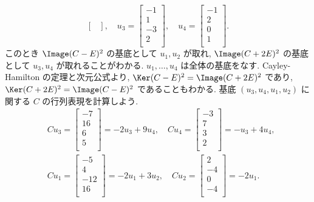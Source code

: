 \documentclass[12pt,twoside]{jarticle}
\begin{document}
\begin{example}
\begin{equation*}
\begin{bmatrix}
    \end{bmatrix},
    \quad
    u_3 =
    \begin{bmatrix}
      -1 \\ 1 \\ -3 \\ 2 \\
    \end{bmatrix},
    \quad
    u_4 =
    \begin{bmatrix}
      -1 \\ 2 \\ 0 \\ 1 \\
    \end{bmatrix}.
  \end{equation*}
  このとき $\Image(C-E)^2$ の基底として $u_1,u_2$ が取れ,
  $\Image(C+2E)^2$ の基底として $u_3,u_4$ が取れることがわかる.
  $u_1,\ldots,u_4$ は全体の基底をなす.
  Cayley-Hamilton の定理と次元公式より, 
  $\Ker(C-E)^2=\Image(C+2E)^2$ であり,
  $\Ker(C+2E)^2=\Image(C-E)^2$ であることもわかる.
  基底 $(u_3,u_4,u_1,u_2)$ に関する $C$ の行列表現を計算しよう.
  \begin{align*}
    &
    Cu_3 =
    \begin{bmatrix}
      -7 \\ 16 \\ 6 \\ 5 \\
    \end{bmatrix}
    = -2u_3 + 9u_4, \quad
    Cu_4 =
    \begin{bmatrix}
      -3 \\ 7 \\ 3 \\ 2 \\
    \end{bmatrix}
    =  -u_3 + 4u_4, 
    \\ &
    Cu_1 =
    \begin{bmatrix}
      -5 \\ 4 \\ -12 \\ 16 \\
    \end{bmatrix}
    = -2u_1 + 3u_2, \quad
    Cu_2 =
    \begin{bmatrix}
      2 \\ -4 \\ 0 \\ -4 \\
    \end{bmatrix}
    = -2u_1.
  \end{align*}

\end{example}
\end{document}
